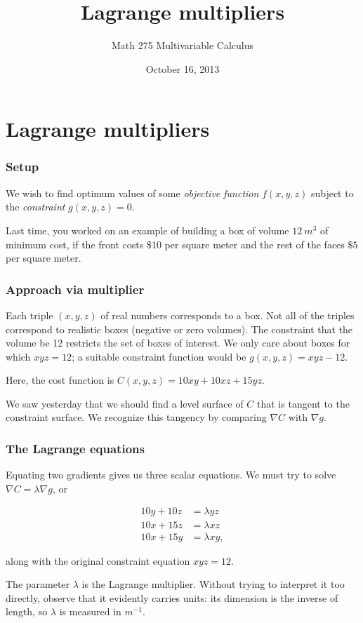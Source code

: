 \documentclass[11pt,ignorenonframetext,aspectratio=169,xcolor={svgnames}]{beamer}
\title{Lagrange multipliers}
\author{Math 275 Multivariable Calculus}
\date{October 16, 2013}
\begin{document}
\frame{\titlepage}

\section{Lagrange multipliers}

\begin{frame}\frametitle{Setup}

We wish to find optimum values of some \emph{objective function}
$f(x,y,z)$ subject to the \emph{constraint} $g(x,y,z) = 0$.

Last time, you worked on an example of building a box of volume
$\SI{12}{m^3}$ of minimum cost, if the front costs $\$10$ per square
meter and the rest of the faces $\$5$ per square meter.

\end{frame}

\begin{frame}\frametitle{Approach via multiplier}

Each triple $(x,y,z)$ of real numbers corresponds to a box. Not all of
the triples correspond to realistic boxes (negative or zero volumes).
The constraint that the volume be 12 restricts the set of boxes of
interest. We only care about boxes for which $xyz = 12$; a suitable
constraint function would be $g(x,y,z) = xyz - 12$.

Here, the cost function is $C(x, y, z) = 10xy + 10xz + 15yz$.

We saw yesterday that we should find a level surface of $C$ that is
tangent to the constraint surface. We recognize this tangency by
comparing $\nabla C$ with $\nabla g$.

\end{frame}

\begin{frame}\frametitle{The Lagrange equations}

Equating two gradients gives us three scalar equations. We must try to
solve $\nabla C = \lambda \nabla g$, or

\begin{align*}
    10y + 10z &= \lambda yz \\
    10x + 15z &= \lambda xz \\
    10x + 15y &= \lambda xy,
\end{align*}

along with the original constraint equation $xyz = 12$.

The parameter $\lambda$ is the Lagrange multiplier. Without trying to
interpret it too directly, observe that it evidently carries units: its
dimension is the inverse of length, so $\lambda$ is measured in
$\si{m^{-1}}$.

\end{frame}
\end{document}
